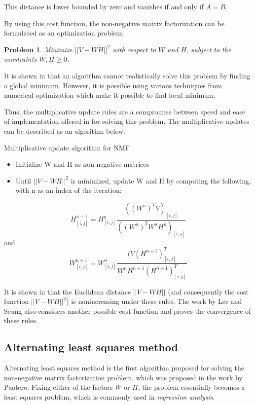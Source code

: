 \documentclass[thesis=M,english]{FITthesis}[2012/10/20]
\newtheorem{problem}{Problem}
\begin{document}
This distance is lower bounded by zero and vanishes if and only if $A = B$.

By using this cost function, the non-negative matrix factorization can be
formulated as an optimization problem:
\begin{problem}
  Minimize $||V - WH||^2$ with respect to $W$ and $H$, subject to the constraints
$W, H \geq 0$.
\end{problem}
It is shown in \cite{lee-algos} that an algorithm cannot realistically solve this
problem by finding a global minimum. However, it is possible using various
techniques from numerical optimization which make it possible to find
local minimum.

Thus, the multiplicative update rules are a compromise between speed and
ease of implementation offered in \cite{lee-algos} for solving this
problem. The multiplicative updates can be described as an algorithm below:

\begin{algorithm}[H]
  \caption{Multiplicative update algorithm for NMF}
  \begin{itemize}
    \item Initialize W and H as non-negative matrices\\
    \item Until $||V - WH||^2$ is minimized, update W and H by computing the
following, with n as an index of the iteration:\\
  \end{itemize}
  \begin{equation}
    H^{n+1}_{[i,j]} = H^{n}_{[i,j]} \frac{((W^{n})^TV)_{[i,j]}}{((W^{n})^{T}W^{n}H^{n})_{[i,j]}}
  \end{equation}
  and
  \begin{equation}
    W^{n+1}_{[i,j]} = W^{n}_{[i,j]} \frac{(V(H^{n+1})^{T}_{[i,j]}}{W^{n}H^{n+1}(H^{n+1})^{T}_{[i,j]}}
  \end{equation}
\end{algorithm}

It is shown in \cite{lee-algos} that the Euclidean distance $||V - WH||$ (and
consequently the cost function $||V - WH||^2$) is nonincreasing under these
rules. The work by Lee and Seung also considers another possible cost function and
proves the convergence of these rules.

\subsection{Alternating least squares method}
Alternating least squares method is the first algorithm proposed for solving
the non-negative matrix factorization problem, which was proposed in the
work by Paatero. \cite{nmf-paatero} Fixing either of the factors $W$ or $H$,
the problem essentially becomes a least squares problem, which is commonly
used in \emph{regression analysis}.
\end{document}
